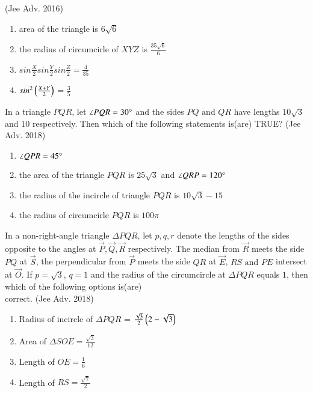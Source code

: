     \hfill{(Jee Adv. 2016)}
    \begin{enumerate}
    	\item area of the triangle is $6\sqrt{6}$
    	\item the radius of circumcirle of $XYZ$ is ${\frac{35\sqrt{6}}{6}}$
    	\item $sin\frac{X}{2}sin\frac{Y}{2}sin\frac{Z}{2} = \frac{4}{35}$
    	\item $sin^{2}\left(\frac{X+Y}{2}\right)$ = $\frac{3}{5}$
    \end{enumerate}
    \item In a triangle $PQR$, let $\angle PQR = 30\degree$ and the sides $PQ \text{ and } QR$ have lengths $10\sqrt{3}$ and $10$ respectively. Then which of the following statements is(are) TRUE?
    \hfill{(Jee Adv. 2018)}
    \begin{enumerate}
    	\item $\angle QPR = 45\degree$
    	\item the area of the triangle $PQR$ is $25\sqrt{3}$ and $\angle QRP = 120\degree$
    	\item the radius of the incircle of triangle $PQR$ is $10\sqrt{3}-15$
    	\item the radius of circumcirle $PQR$ is $100\pi$
    \end{enumerate}
    \item In a non-right-angle triangle $\Delta PQR$, let $p,q,r$ denote the lengths of the sides opposite to the angles at $\vec{P},\vec{Q},\vec{R}$ respectively. The median from $\vec{R}$ meets the side $PQ$ at $\vec{S}$, the perpendicular from $\vec{P}$ meets the side $QR$ at $\vec{E}$, $RS \text{ and } PE$ intersect at $\vec{O}$. If $p = \sqrt{3}$, $q = 1$ and the radius of the circumcircle at $\Delta PQR$ equals $1$, then which of the following options is(are)\\ correct.
    \hfill{(Jee Adv. 2018)}
    \begin{enumerate}
    	\item Radius of incircle of $\Delta PQR$ = $\frac{\sqrt{3}}{2}\left(2-\sqrt{3}\right)$
    	\item Area of $\Delta SOE = \frac{\sqrt{3}}{12}$
    	\item Length of $OE = \frac{1}{6}$
    	\item Length of $RS = \frac{\sqrt{7}}{2}$
    \end{enumerate}


